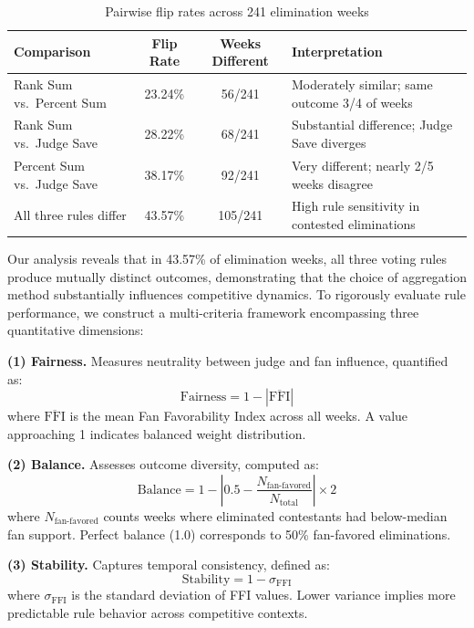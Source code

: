 \documentclass{mcmthesis}
\begin{document}
\begin{table}[h]
\centering
\caption{Pairwise flip rates across 241 elimination weeks}
\begin{tabular}{l c c p{5.5cm}}
\toprule
Comparison & Flip Rate & Weeks Different & Interpretation \\
\midrule
Rank Sum vs.\ Percent Sum & 23.24\% & 56/241 & Moderately similar; same outcome 3/4 of weeks \\
Rank Sum vs.\ Judge Save & 28.22\% & 68/241 & Substantial difference; Judge Save diverges \\
Percent Sum vs.\ Judge Save & 38.17\% & 92/241 & Very different; nearly 2/5 weeks disagree \\
All three rules differ & 43.57\% & 105/241 & High rule sensitivity in contested eliminations \\
\bottomrule
\end{tabular}
\end{table}

Our analysis reveals that in 43.57\% of elimination weeks, all three voting rules produce mutually distinct outcomes, demonstrating that the choice of aggregation method\cite{6} substantially influences competitive dynamics. To rigorously evaluate rule performance, we construct a multi-criteria framework encompassing three quantitative dimensions:

\textbf{(1) Fairness.} Measures neutrality between judge and fan influence, quantified as:
\begin{equation}
\text{Fairness} = 1 - |\overline{\text{FFI}}|
\end{equation}
where $\overline{\text{FFI}}$ is the mean Fan Favorability Index across all weeks. A value approaching 1 indicates balanced weight distribution.

\textbf{(2) Balance.} Assesses outcome diversity, computed as:
\begin{equation}
\text{Balance} = 1 - \left|0.5 - \frac{N_{\text{fan-favored}}}{N_{\text{total}}}\right| \times 2
\end{equation}
where $N_{\text{fan-favored}}$ counts weeks where eliminated contestants had below-median fan support. Perfect balance (1.0) corresponds to 50\% fan-favored eliminations.

\textbf{(3) Stability.} Captures temporal consistency, defined as:
\begin{equation}
\text{Stability} = 1 - \sigma_{\text{FFI}}
\end{equation}
where $\sigma_{\text{FFI}}$ is the standard deviation of FFI values. Lower variance implies more predictable rule behavior across competitive contexts.
\end{document}

